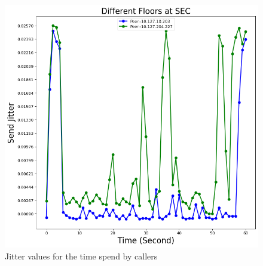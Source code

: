 	\begin{figure}[!t]
		\begin{minipage}{\textwidth}
			\includegraphics[scale=0.38]{Images/experiment/senarios/df_diff_floor.png}
		\end{minipage}
		\caption{Jitter values for the time spend by callers}
		\label{fig:scene-out-3}
	\end{figure}


